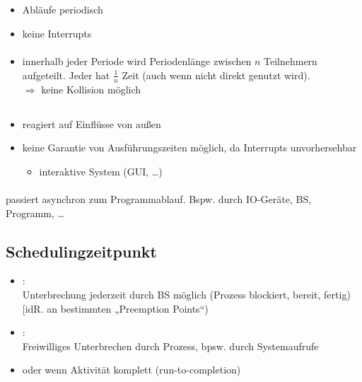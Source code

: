 \subsection[Zeitgesteuertes Scheduling]{}
\begin{itemize}
\item Abläufe periodisch
\item keine Interrupts
\end{itemize}
\paragraph{}
\begin{itemize}
\item innerhalb jeder Periode wird Periodenlänge zwischen $n$ Teilnehmern aufgeteilt. Jeder hat $\tfrac{1}{n}$ Zeit (auch wenn nicht direkt genutzt wird). \\
$\Rightarrow$ keine Kollision möglich
\end{itemize}

\subsection[Ereignisgesteuertes Scheduling]{}
\begin{itemize}
\item reagiert auf Einflüsse von außen
\item keine Garantie von Ausführungszeiten möglich, da Interrupts unvorhersehbar
\begin{itemize}[label = $\to$]
\item interaktive System (GUI, …)
\end{itemize}
\end{itemize}

\paragraph{} passiert asynchron zum Programmablauf. Bspw. durch IO-Geräte, BS, Programm, …

\subsection{Schedulingzeitpunkt}
\begin{itemize}
\item {}:\\
Unterbrechung jederzeit durch BS möglich (Prozess blockiert, bereit, fertig) [idR. an bestimmten „Preemption Points“)
\item {}:\\
Freiwilliges Unterbrechen durch Prozess, bpsw. durch Systemaufrufe
\item oder wenn Aktivität komplett (run-to-completion)
\end{itemize}

